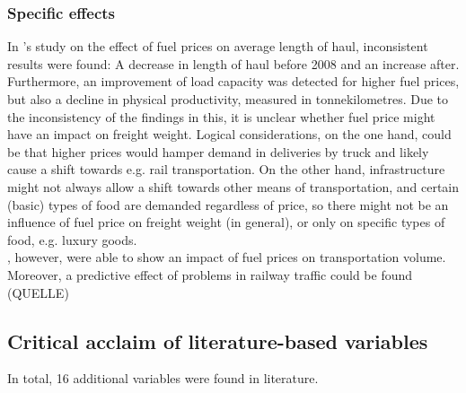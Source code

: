 \documentclass[a4paper, 11pt]{article}
\begin{document}
\subsubsection{Specific effects}
In \cite{Abate.2014}'s study on the effect of fuel prices on average length of haul, inconsistent results were found: A decrease in length of haul before 2008 and an increase after. Furthermore, an improvement of load capacity was detected for higher fuel prices, but also a decline in physical productivity, measured in tonnekilometres.
Due to the inconsistency of the findings in this, it is unclear whether fuel price might have an impact on freight weight. Logical considerations, on the one hand, could be that higher prices would hamper demand in deliveries by truck and likely cause a shift towards e.g. rail transportation. On the other hand, infrastructure might not always allow a shift towards other means of transportation, and certain (basic) types of food are demanded regardless of price, so there might not be an influence of fuel price on freight weight (in general), or only on specific types of food, e.g. luxury goods.\\
\cite{Lahiri.2006}, however, were able to show an impact of fuel prices on transportation volume. \\
Moreover, a predictive effect of problems in railway traffic could be found (QUELLE)

\subsection{Critical acclaim of literature-based variables}

In total, 16 additional variables were found in literature.\\ 
\end{document}
